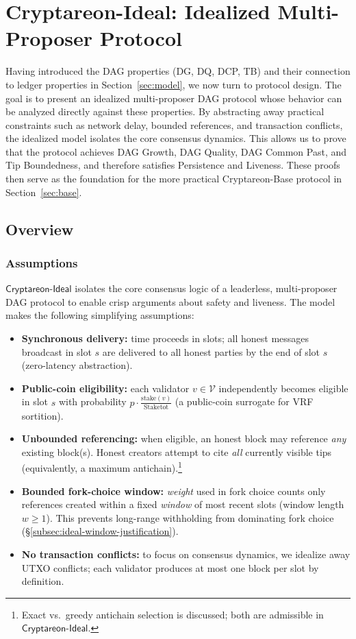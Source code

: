 \documentclass[11pt]{article}
\newcommand{\ProjIdeal}{\ensuremath{\mathsf{Cryptareon\text{-}Ideal}}\xspace}
\newcommand{\Val}{\ensuremath{\mathcal{V}}\xspace}
\newcommand{\stake}{\ensuremath{\mathrm{stake}}\xspace}
\newcommand{\StakeTot}{\ensuremath{\mathrm{Stake}{\mathrm{tot}}}\xspace}
\newcommand{\stakefrac}[1]{\ensuremath{\frac{\stake(#1)}{\StakeTot}}\xspace}
\begin{document}
\section{Cryptareon-Ideal: Idealized Multi-Proposer Protocol}
\label{sec:ideal}
Having introduced the DAG properties (DG, DQ, DCP, TB) and their connection to ledger
properties in Section~\ref{sec:model}, we now turn to protocol design. The goal is to present an idealized
multi-proposer DAG protocol whose behavior can be analyzed directly against these properties.
By abstracting away practical constraints such as network delay, bounded references, and
transaction conflicts, the idealized model isolates the core consensus dynamics. This allows us
to prove that the protocol achieves DAG Growth, DAG Quality, DAG Common Past, and Tip
Boundedness, and therefore satisfies Persistence and Liveness. These proofs then serve as the
foundation for the more practical Cryptareon-Base protocol in Section~\ref{sec:base}.

\subsection{Overview}
\subsubsection{Assumptions}
\label{subsec:ideal-overview}
\ProjIdeal isolates the core consensus logic of a leaderless, multi-proposer DAG protocol to enable crisp arguments about safety and liveness. The model makes the following simplifying assumptions:
\begin{itemize}
  \item \textbf{Synchronous delivery:} time proceeds in slots; all honest messages broadcast in slot $s$ are delivered to all honest parties by the end of slot $s$ (zero-latency abstraction).
  \item \textbf{Public-coin eligibility:} each validator $v\in\Val$ independently becomes eligible in slot $s$ with probability $p\cdot\stakefrac{v}$ (a public-coin surrogate for VRF sortition).
  \item \textbf{Unbounded referencing:} when eligible, an honest block may reference \emph{any} existing block(s). Honest creators attempt to cite \emph{all} currently visible tips (equivalently, a maximum antichain).\footnote{Exact vs.\ greedy antichain selection is discussed; both are admissible in \ProjIdeal.}
  \item \textbf{Bounded fork-choice window:} \emph{weight} used in fork choice counts only references created within a fixed \emph{window} of most recent slots (window length $w\ge1$). This prevents long-range withholding from dominating fork choice (\S\ref{subsec:ideal-window-justification}).
  \item \textbf{No transaction conflicts:} to focus on consensus dynamics, we idealize away UTXO conflicts; each validator produces at most one block per slot by definition.
\end{itemize}
\end{document}
